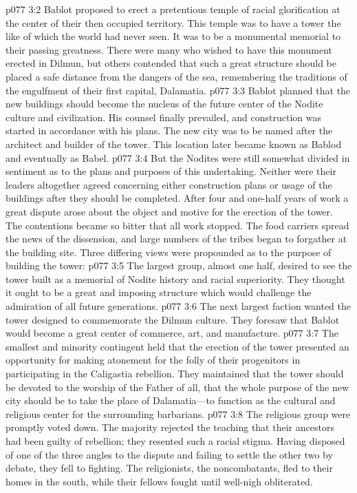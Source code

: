 \vs p077 3:2 Bablot proposed to erect a pretentious temple of racial glorification at the center of their then occupied territory. This temple was to have a tower the like of which the world had never seen. It was to be a monumental memorial to their passing greatness. There were many who wished to have this monument erected in Dilmun, but others contended that such a great structure should be placed a safe distance from the dangers of the sea, remembering the traditions of the engulfment of their first capital, Dalamatia.
\vs p077 3:3 Bablot planned that the new buildings should become the nucleus of the future center of the Nodite culture and civilization. His counsel finally prevailed, and construction was started in accordance with his plans. The new city was to be named  after the architect and builder of the tower. This location later became known as Bablod and eventually as Babel.
\vs p077 3:4 But the Nodites were still somewhat divided in sentiment as to the plans and purposes of this undertaking. Neither were their leaders altogether agreed concerning either construction plans or usage of the buildings after they should be completed. After four and one\hyp{}half years of work a great dispute arose about the object and motive for the erection of the tower. The contentions became so bitter that all work stopped. The food carriers spread the news of the dissension, and large numbers of the tribes began to forgather at the building site. Three differing views were propounded as to the purpose of building the tower:
\pc \vs p077 3:5 \bibnobreakspace The largest group, almost one half, desired to see the tower built as a memorial of Nodite history and racial superiority. They thought it ought to be a great and imposing structure which would challenge the admiration of all future generations.
\pc \vs p077 3:6 \bibnobreakspace The next largest faction wanted the tower designed to commemorate the Dilmun culture. They foresaw that Bablot would become a great center of commerce, art, and manufacture.
\pc \vs p077 3:7 \bibnobreakspace The smallest and minority contingent held that the erection of the tower presented an opportunity for making atonement for the folly of their progenitors in participating in the Caligastia rebellion. They maintained that the tower should be devoted to the worship of the Father of all, that the whole purpose of the new city should be to take the place of Dalamatia---to function as the cultural and religious center for the surrounding barbarians.
\pc \vs p077 3:8 The religious group were promptly voted down. The majority rejected the teaching that their ancestors had been guilty of rebellion; they resented such a racial stigma. Having disposed of one of the three angles to the dispute and failing to settle the other two by debate, they fell to fighting. The religionists, the noncombatants, fled to their homes in the south, while their fellows fought until well\hyp{}nigh obliterated.
